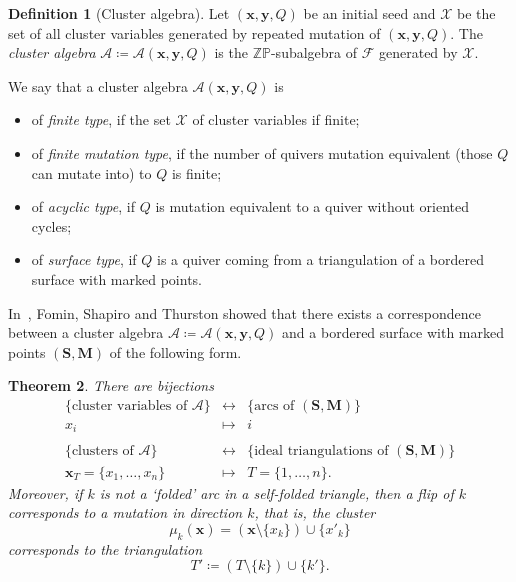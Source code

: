 \documentclass[a4paper,oneside,svgnames,draft]{amsart}
\theoremstyle{plain}
\newtheorem{theorem}{Theorem}[section]
\theoremstyle{definition}
\newtheorem{definition}[theorem]{Definition}
\begin{document}
 \begin{definition}[Cluster algebra]
  Let $(\mathbf{x},\mathbf{y},Q)$ be an initial seed and $\mathcal{X}$ be the
  set of all cluster variables generated by repeated mutation of
  $(\mathbf{x},\mathbf{y},Q)$. The \emph{cluster algebra} $\mathcal{A} \coloneqq
  \mathcal{A}(\mathbf{x},\mathbf{y},Q)$ is the $\mathbb{Z}\mathbb{P}$-subalgebra
  of $\mathcal{F}$ generated by $\mathcal{X}$.

  We say that a cluster algebra $\mathcal{A}(\mathbf{x},\mathbf{y},Q)$ is
  \begin{itemize}
   \item of \emph{finite type}, if the set $\mathcal{X}$ of cluster variables if
    finite;
   \item of \emph{finite mutation type}, if the number of quivers mutation
    equivalent (those $Q$ can mutate into) to $Q$ is finite;
   \item of \emph{acyclic type}, if $Q$ is mutation equivalent to a quiver
    without oriented cycles;
   \item of \emph{surface type}, if $Q$ is a quiver coming from a triangulation
    of a bordered surface with marked points.
  \end{itemize}
 \end{definition}

 In~\cite{fst}, Fomin, Shapiro and Thurston showed that there exists a
 correspondence between a cluster algebra $\mathcal{A} \coloneqq
 \mathcal{A}(\mathbf{x},\mathbf{y},Q)$ and a bordered surface with marked points
 $(\mathbf{S},\mathbf{M})$ of the following form.

 \begin{theorem}
  There are bijections
  \begin{equation*}
   \begin{array}{ccc}
    \{\text{cluster variables of }\mathcal{A}\} &\longleftrightarrow &
    \{\text{arcs of }(\mathbf{S},\mathbf{M})\}\\
    x_i &\longmapsto & i\\
                                       &&\\
    \{\text{clusters of }\mathcal{A}\} &\longleftrightarrow & \{\text{ideal
    triangulations of }(\mathbf{S},\mathbf{M})\}\\
      \mathbf{x}_T = \{x_1,\ldots,x_n\} & \longmapsto & T = \{1,\ldots,n\}.
   \end{array}
  \end{equation*}
  Moreover, if $k$ is not a `folded' arc in a self-folded triangle, then a flip
  of $k$ corresponds to a mutation in direction $k$, that is, the cluster
  \[
   \mu_k(\mathbf{x}) = (\mathbf{x} \setminus \{x_k\}) \cup \{x'_k\}
  \]
  corresponds to the triangulation
  \[
   T' \coloneqq (T \setminus \{k\}) \cup \{k'\}.
  \]
 \end{theorem}
\end{document}
